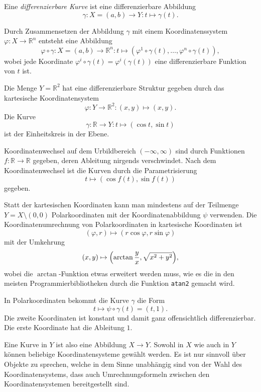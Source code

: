 \begin{definition}
Eine {\em differenzierbare Kurve}
%
%
ist eine differenzierbare Abbildung
\[
\gamma
\colon
X = (a,b) \to Y
:
t \mapsto \gamma(t).
\]
\end{definition}

Durch Zusammensetzen der Abbildung $\gamma$ mit einem Koordinatenssystem
$\varphi\colon X\to \mathbb{R}^n$ entsteht eine Abbildung 
\[
\varphi\circ\gamma
\colon
X=(a,b) \to \mathbb{R}^n
:
t \mapsto (\varphi^1\circ \gamma(t),\dots,\varphi^n\circ\gamma(t)),
\]
wobei jede Koordinate $\varphi^i\circ\gamma(t) = \varphi^i(\gamma(t))$
eine differenzierbare Funktion von $t$ ist.

\begin{beispiel}
Die Menge $Y=\mathbb{R}^2$ hat eine differenzierbare Struktur gegeben durch
das kartesische Koordinatensystem
\[
\varphi
\colon
Y\to\mathbb{R}^2
:
(x,y)\mapsto (x,y).
\]
Die Kurve 
\[
\gamma
\colon
\mathbb{R}\to Y
:
t\mapsto (\cos t, \sin t)
\]
ist der Einheitskreis in der Ebene.

Koordinatenwechsel auf dem Urbildbereich $(-\infty,\infty)$ sind durch
Funktionen $f\colon\mathbb{R}\to\mathbb{R}$ gegeben, deren Ableitung
nirgends verschwindet.
Nach dem Koordinatenwechsel ist die Kurven durch die Parametrisierung
\[
t \mapsto (\cos f(t),\sin f(t))
\]
gegeben.

Statt der kartesischen Koordinaten kann man mindestens auf der Teilmenge
$Y=X\setminus (0,0)$ Polarkoordinaten mit der Koordinatenabbildung $\psi$
verwenden.
Die Koordinatenumrechnung von Polarkoordinaten in kartesische Koordinaten
ist
\[
(\varphi, r) \mapsto (r\cos\varphi,r\sin\varphi)
\]
mit der Umkehrung
\[
(x,y) \mapsto \Bigl(\arctan\frac{y}{x},\sqrt{x^2+y^2}\Bigr),
\]
wobei die $\arctan$-Funktion etwas erweitert werden muss, wie es die
in den meisten Programmierbibliotheken durch die Funktion \texttt{atan2}
gemacht wird.

In Polarkoordinaten bekommt die Kurve $\gamma$ die Form
\[
t\mapsto \psi\circ\gamma(t)
=
(t, 1).
\]
Die zweite Koordinaten ist konstant und damit ganz offensichtlich 
differenzierbar.
Die erste Koordinate hat die Ableitung $1$.
\end{beispiel}

Eine Kurve in $Y$ ist also eine Abbildung $X\to Y$.
Sowohl in $X$ wie auch in $Y$ können beliebige Koordinatensysteme
gewählt werden.
Es ist nur sinnvoll über Objekte zu sprechen, welche in dem
Sinne unabhängig sind von der Wahl des Koordinatensystems, dass
auch Umrechnungsformeln zwischen den Koordinatensystemen bereitgestellt
sind.

